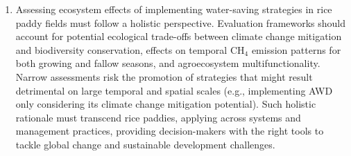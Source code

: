\begin{enumerate}

\item Assessing ecosystem effects of implementing water-saving strategies in rice paddy fields must follow a holistic perspective. Evaluation frameworks should account for potential ecological trade-offs between climate change mitigation and biodiversity conservation, effects on temporal CH$_{4}$ emission patterns for both growing and fallow seasons, and agroecosystem multifunctionality. Narrow assessments risk the promotion of strategies that might result detrimental on large temporal and spatial scales (e.g., implementing AWD only considering its climate change mitigation potential). Such holistic rationale must transcend rice paddies, applying across systems and management practices, providing decision-makers with the right tools to tackle global change and sustainable development challenges.\\

\end{enumerate}